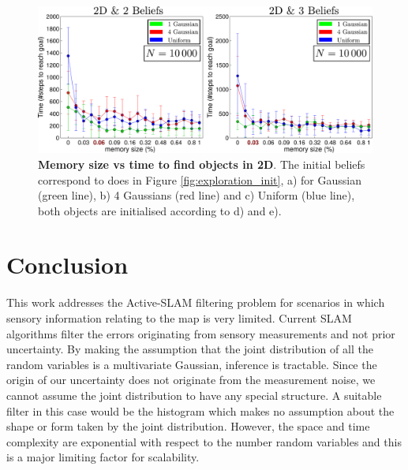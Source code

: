 \begin{figure}
  \centering
  \includegraphics[width=\textwidth]{./ch5-MLMF/Figures/exper_mem_all.pdf}
  \caption{\textbf{Memory size vs time to find objects in 2D}. The initial beliefs correspond 
  to does in Figure \ref{fig:exploration_init}, a) for Gaussian (green line), b) 4 Gaussians (red line)
  and c) Uniform (blue line), both objects are initialised according to d) and e).}
   \label{fig:time_to_reach_goal_2D}
\end{figure}



\FloatBarrier
\section{Conclusion}\label{ch5:conclusion}

This work addresses the Active-SLAM filtering problem for scenarios in which sensory information relating to the map is very limited. Current
SLAM algorithms filter the errors originating from sensory measurements and not prior uncertainty. By making the assumption
that the joint distribution of all the random variables is a multivariate Gaussian, inference is tractable. Since the origin of 
our uncertainty does not originate from the measurement noise, we cannot assume the joint distribution to have any special structure. 
A suitable filter in this case would be the histogram which makes no assumption about the shape or form taken by the joint distribution. 
However, the space and time complexity are exponential with respect to the number random variables and this is a major 
limiting factor for scalability. 


